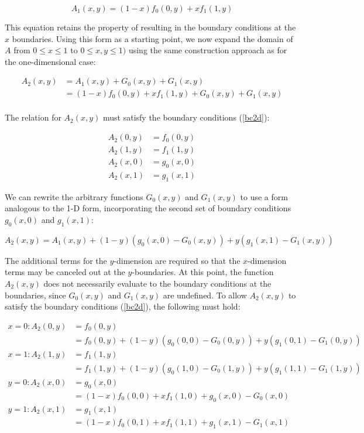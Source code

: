 \documentclass{article}
\begin{document}
\begin{equation}
  A_1(x,y) = (1-x)f_0(0,y) + xf_1(1,y)
\end{equation}

\noindent This equation retains the property of resulting in the boundary conditions at the $x$ boundaries. Using this form as a starting point, we now expand the domain of $A$ from $0 \le x \le 1$ to $0 \le x,y \le 1)$ using the same construction approach as for the one-dimensional case:

\begin{equation}
\begin{split}
  A_2(x,y) &= A_1(x,y) + G_0(x,y) + G_1(x,y) \\
  &= (1-x)f_0(0,y) + xf_1(1,y) + G_0(x,y) + G_1(x,y) \\
\end{split}
\end{equation}

The relation for $A_2(x,y)$ must satisfy the boundary conditions (\ref{bc2d}):

\begin{equation}
\begin{split}
  A_2(0,y) &= f_0(0,y) \\
  A_2(1,y) &= f_1(1,y) \\
  A_2(x,0) &= g_0(x,0) \\
  A_2(x,1) &= g_1(x,1)
\end{split}
\end{equation}

We can rewrite the arbitrary functions $G_0(x,y)$ and $G_1(x,y)$ to use a form analogous to the 1-D form, incorporating the second set of boundary conditions $g_0(x,0)$ and $g_1(x,1)$:

\begin{equation}
  A_2(x,y) = A_1(x,y) + (1-y)(g_0(x,0) - G_0(x,y)) + y(g_1(x,1) - G_1(x,y))
\end{equation}

\noindent The additional terms for the $y$-dimension are required so that the $x$-dimension terms may be canceled out at the $y$-boundaries. At this point, the function $A_2(x,y)$ does not necessarily evaluate to the boundary conditions at the boundaries, since $G_0(x,y)$ and $G_1(x,y)$ are undefined. To allow $A_2(x,y)$ to satisfy the boundary conditions (\ref{bc2d}), the following must hold:

\begin{equation}
\begin{split}
  x=0: A_2(0,y) &= f_0(0,y) \\
  &= f_0(0,y) + (1-y)(g_0(0,0) - G_0(0,y)) + y(g_1(0,1) - G_1(0,y)) \\
  x=1: A_2(1,y) &= f_1(1,y) \\
  &= f_1(1,y) + (1-y)(g_0(1,0) - G_0(1,y)) + y(g_1(1,1) - G_1(1,y)) \\
  y=0: A_2(x,0) &= g_0(x,0) \\
  &= (1-x)f_0(0,0) + xf_1(1,0) + g_0(x,0) - G_0(x,0) \\
  y=1: A_2(x,1) &= g_1(x,1) \\
  &= (1-x)f_0(0,1) + xf_1(1,1) + g_1(x,1) - G_1(x,1)
\end{split}
\end{equation}
\end{document}
